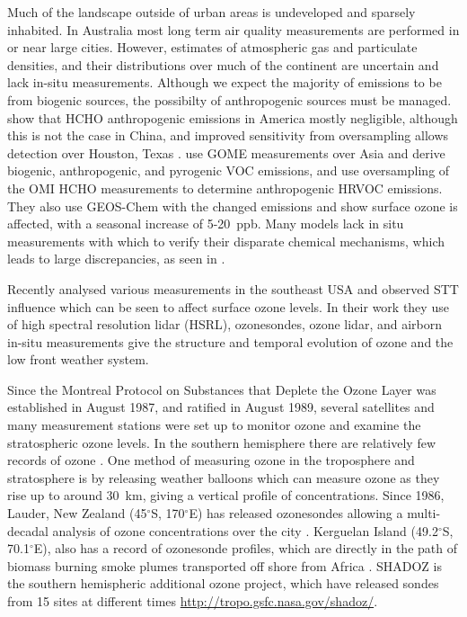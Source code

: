       Much of the landscape outside of urban areas is undeveloped and sparsely inhabited.
      In Australia most long term air quality measurements are performed in or near large cities.
      However, estimates of atmospheric gas and particulate densities, and their distributions over much of the continent are uncertain and lack in-situ measurements.
      Although we expect the majority of emissions to be from biogenic sources, the possibilty of anthropogenic sources must be managed.
      \cite{Millet2008} show that HCHO anthropogenic emissions in America mostly negligible, although this is not the case in China, and improved sensitivity from oversampling allows detection over Houston, Texas \citep{Fu2007, Zhu2014}.
      \cite{Fu2007} use GOME measurements over Asia and derive biogenic, anthropogenic, and pyrogenic VOC emissions, and \cite{Zhu2014} use oversampling of the OMI HCHO measurements to determine anthropogenic HRVOC emissions.
      They also use GEOS-Chem with the changed emissions and show surface ozone is affected, with a seasonal increase of 5-20~ppb.
      Many models lack in situ measurements with which to verify their disparate chemical mechanisms, which leads to large discrepancies, as seen in \cite{Marvin2017a}.
      
      Recently \cite{Kuang2017} analysed various measurements in the southeast USA and observed STT influence which can be seen to affect surface ozone levels.
      In their work they use of high spectral resolution lidar (HSRL), ozonesondes, ozone lidar, and airborn in-situ measurements give the structure and temporal evolution of ozone and the low front weather system.
      
      Since the Montreal Protocol on Substances that Deplete the Ozone Layer was established in August 1987, and ratified in August 1989, several satellites and many measurement stations were set up to monitor ozone and examine the stratospheric ozone levels.
      In the southern hemisphere there are relatively few records of ozone \citep{Huang2017}.
      One method of measuring ozone in the troposphere and stratosphere is by releasing weather balloons which can measure ozone as they rise up to around 30~km, giving a vertical profile of concentrations.
      Since 1986, Lauder, New Zealand (45$^{\circ}$S, 170$^{\circ}$E) has released ozonesondes allowing a multi-decadal analysis of ozone concentrations over the city \citep{Brinksma2002}.
      Kerguelan Island (49.2$^{\circ}$S, 70.1$^{\circ}$E), also has a record of ozonesonde profiles, which are directly in the path of biomass burning smoke plumes transported off shore from Africa \citep{Baray2012}.
      SHADOZ is the southern hemispheric additional ozone project, which have released sondes from 15 sites at different times \url{http://tropo.gsfc.nasa.gov/shadoz/}.
      
